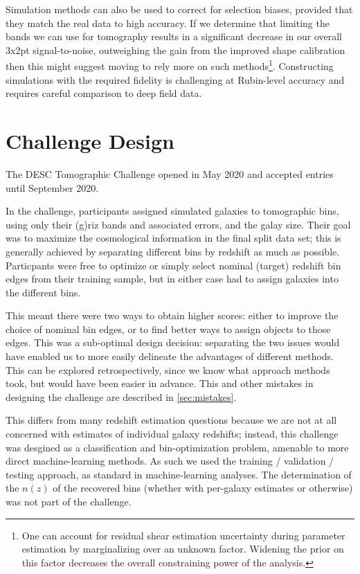 \documentclass[twocolumn,twocolappendix]{aastex63}
\begin{document}
Simulation methods can also be used to correct for selection biases, provided that they match the
real data to high accuracy.  If we determine that limiting the bands we can use for tomography results
in a significant decrease in our overall 3x2pt signal-to-noise, outweighing the gain from the improved shape
calibration then this might suggest moving to rely more on such methods\footnote{One can account for
residual shear estimation uncertainty during parameter estimation by marginalizing over an unknown
factor.  Widening the prior on this factor decreases the overall constraining power of the analysis.}.
Constructing simulations with the required fidelity is challenging at Rubin-level accuracy and requires
careful comparison to deep field data.


\section{Challenge Design} \label{sec:design}

The DESC Tomographic Challenge opened in May 2020 and accepted entries until September 2020.

In the challenge, participants assigned simulated galaxies to tomographic bins,
using only their (g)riz bands and associated errors, and the galay size.  Their goal was to maximize the cosmological
information in the final split data set; this is generally achieved by separating different bins by 
redshift as much as possible.  Particpants were free to optimize or simply select nominal (target) 
redshift bin edges from their training sample, but in either case had to assign galaxies into the 
different bins.

This meant there were two ways to obtain higher scores: either to improve the choice of nominal bin
edges, or to find better ways to assign objects to those edges.  This was a sub-optimal design decision:
separating the two issues would have enabled us to more easily delineate the advantages of different methods. 
This can be explored retrospectively, since we know what approach methods took, but would have been
easier in advance.  This and other mistakes in designing the challenge are described in \autoref{sec:mistakes}.

This differs from many redshift estimation questions because we are not at all concerned with estimates
of individual galaxy redshifts; instead, this challenge was desgined as a classification and bin-optimization
problem, amenable to more direct machine-learning methods.  As such we used the training / validation / testing
approach, as standard in machine-learning analyses.
The determination of the $n(z)$ of the recovered
bins (whether with per-galaxy estimates or otherwise) was not part of the challenge.
\end{document}
